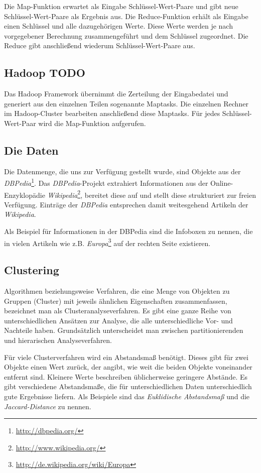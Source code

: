 \documentclass[a4paper]{llncs}
\begin{document}
Die Map-Funktion erwartet als Eingabe Schlüssel-Wert-Paare und gibt neue Schlüssel-Wert-Paare als Ergebnis aus. Die Reduce-Funktion erhält als Eingabe einen Schlüssel und alle dazugehörigen Werte. Diese Werte werden je nach vorgegebener Berechnung zusammengeführt und dem Schlüssel zugeordnet. Die Reduce gibt anschließend wiederum Schlüssel-Wert-Paare aus.

\subsection{Hadoop TODO}
Das Hadoop Framework übernimmt die Zerteilung der Eingabedatei und generiert aus den einzelnen Teilen sogenannte Maptasks. Die einzelnen Rechner im Hadoop-Cluster bearbeiten anschließend diese Maptasks. Für jedes Schlüssel-Wert-Paar wird die Map-Funktion aufgerufen.

\subsection{Die Daten}
Die Datenmenge, die uns zur Verfügung gestellt wurde, sind Objekte aus der \emph{DBPedia}\footnote{\url{http://dbpedia.org/}}. Das \emph{DBPedia}-Projekt extrahiert Informationen aus der Online-Enzyklopädie \emph{Wikipedia}\footnote{\url{http://www.wikipedia.org/}}, bereitet diese auf und stellt diese strukturiert zur freien Verfügung. Einträge der \emph{DBPedia} entsprechen damit weitesgehend Artikeln der \emph{Wikipedia}.

Als Beispiel für Informationen in der DBPedia sind die Infoboxen zu nennen, die in vielen Artikeln wie z.B. \emph{Europa}\footnote{\url{http://de.wikipedia.org/wiki/Europa}} auf der rechten Seite existieren.

\subsection{Clustering}
Algorithmen beziehungsweise Verfahren, die eine Menge von Objekten zu Gruppen (Cluster) mit jeweils ähnlichen Eigenschaften zusammenfassen, bezeichnet man als Clusteranalyseverfahren. Es gibt eine ganze Reihe von unterschiedlichen Ansätzen zur Analyse, die alle unterschiedliche Vor- und Nachteile haben. Grundsätzlich unterscheidet man zwischen partitionierenden und hierarischen Analyseverfahren.

Für viele Clusterverfahren wird ein Abstandsmaß benötigt. Dieses gibt für zwei Objekte einen Wert zurück, der angibt, wie weit die beiden Objekte voneinander entfernt sind. Kleinere Werte beschreiben üblicherweise geringere Abstände. Es gibt verschiedene Abstandsmaße, die für unterschiedlichen Daten unterschiedlich gute Ergebnisse liefern. Als Beispiele sind das \emph{Euklidische Abstandsmaß} und die \emph{Jaccard-Distance} zu nennen.
\end{document}
